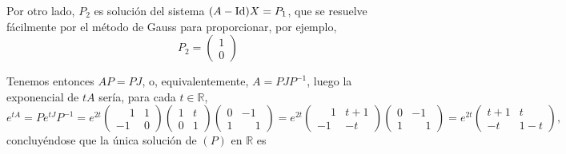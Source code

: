 \documentclass[11pt]{report}
\newcommand{\R}{\mathbb R}
\begin{document}
Por otro lado, $P_2$ es solución del sistema $(A-\textup{Id})X=P_1$, que se resuelve fácilmente por el método de Gauss para proporcionar, por ejemplo,
\[P_2=\begin{pmatrix}
    1 \\
    0
\end{pmatrix}\]

Tenemos entonces $AP=PJ$, o, equivalentemente, $A=PJP^{-1}$, luego la exponencial de $tA$ sería, para cada $t \in \R$,
\[e^{tA}=Pe^{tJ}P^{-1}=e^{2t}\begin{pmatrix}
    \phantom{-}1 & 1 \\
    -1 & 0
\end{pmatrix}\begin{pmatrix}
    1 & t \\
    0 & 1
\end{pmatrix}\begin{pmatrix}
    0 & -1 \\
    1 & \phantom{-}1
\end{pmatrix}=e^{2t}\begin{pmatrix}
    \phantom{-}1 & t+1 \\
    -1 & -t
\end{pmatrix}\begin{pmatrix}
    0 & -1 \\
    1 & \phantom{-}1
\end{pmatrix}=e^{2t}\begin{pmatrix}
    t+1 & t \\
    -t & 1-t
\end{pmatrix},\]
concluyéndose que la única solución de $(P)$ en $\R$ es
\end{document}
